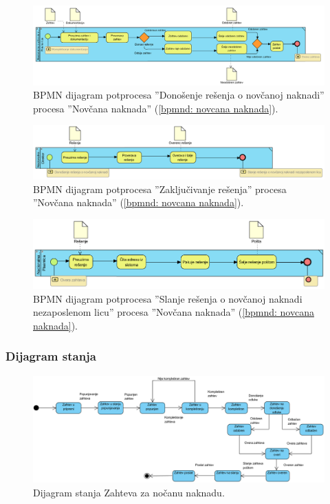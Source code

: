 \begin{mylandscape}
	\newpage
	
	\begin{figure}[H]
		\centering
		\includegraphics[width=0.6\paperwidth]{dijagrami/bpmn-dijagrami/bpmn-4.png}
		\caption{BPMN dijagram potprocesa ''Dono\v senje re\v senja o nov\v canoj naknadi'' procesa ''Nov\v cana naknada'' (\ref{bpmnd: novcana naknada}).}
	\end{figure}
	
	\begin{figure}[H]
		\centering
		\includegraphics[width=0.6\paperwidth]{dijagrami/bpmn-dijagrami/bpmn-5.png}
		\caption{BPMN dijagram potprocesa ''Zaklju\v civanje re\v senja'' procesa ''Nov\v cana naknada'' (\ref{bpmnd: novcana naknada}).}
	\end{figure}

	\newpage
	
	\begin{figure}[H]
		\centering
		\includegraphics[width=0.6\paperwidth]{dijagrami/bpmn-dijagrami/bpmn-6.png}
		\caption{BPMN dijagram potprocesa ''Slanje re\v senja o nov\v canoj naknadi nezaposlenom licu'' procesa ''Nov\v cana naknada'' (\ref{bpmnd: novcana naknada}).}
	\end{figure}
\end{mylandscape}

\begin{mylandscape}

\subsubsection{Dijagram stanja}

	\begin{figure}[H]
		\centering
		\includegraphics[width=0.7\paperwidth]{dijagrami/dijagrami-stanja/novcana-naknada.png}
		\caption{Dijagram stanja Zahteva za no\v canu naknadu.}
	\end{figure}
	
	
\end{mylandscape}

